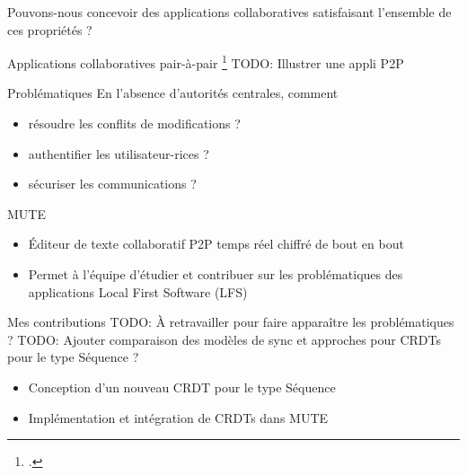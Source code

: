 \begin{frame}[standout]
    Pouvons-nous concevoir des applications collaboratives satisfaisant l'ensemble de ces propriétés ?
\end{frame}

\begin{frame}{Applications collaboratives pair-à-pair \footcite{localfirstsoftware2019}}
    TODO: Illustrer une appli P2P
    \begin{block}{Problématiques}
        En l'absence d'autorités centrales, comment
        \begin{itemize}
            \item résoudre les conflits de modifications ?
            \item authentifier les utilisateur-rices ?
            \item sécuriser les communications ?
        \end{itemize}
    \end{block}
\end{frame}


\begin{frame}{MUTE }
    \begin{figure}
    \end{figure}
    \begin{itemize}
        \item Éditeur de texte collaboratif P2P temps réel chiffré de bout en bout
        \item Permet à l'équipe d'étudier et contribuer sur les problématiques des applications Local First Software (LFS)
    \end{itemize}
\end{frame}

\begin{frame}{Mes contributions}
    TODO: À retravailler pour faire apparaître les problématiques ?
    TODO: Ajouter comparaison des modèles de sync et approches pour CRDTs pour le type Séquence ?
    \begin{itemize}
        \item Conception d'un nouveau CRDT pour le type Séquence
        \item Implémentation et intégration de CRDTs dans MUTE
    \end{itemize}
\end{frame}

